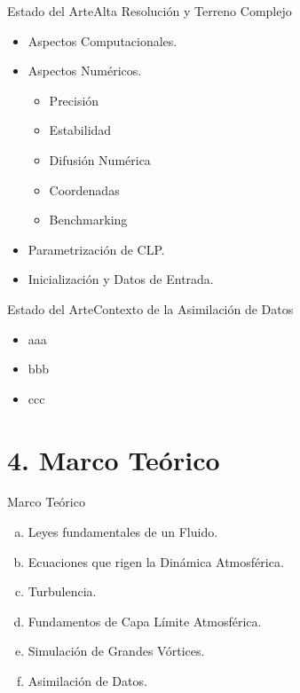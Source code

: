 \documentclass[mathserif]{beamer}
\begin{document}
\begin{frame}{Estado del Arte}{Alta Resolución y Terreno Complejo}
	\begin{itemize}
		\item Aspectos Computacionales.
		\item Aspectos Numéricos.
		\begin{itemize}
			\item Precisión
			\item Estabilidad
			\item Difusión Numérica
			\item Coordenadas
			\item Benchmarking
		\end{itemize}
		\item Parametrización de CLP.
		\item Inicialización y Datos de Entrada.
	\end{itemize}
\end{frame}

\begin{frame}{Estado del Arte}{Contexto de la Asimilación de Datos}
	\begin{itemize}
		\item aaa
		\item bbb
		\item ccc
	\end{itemize}
\end{frame}












\section{4. Marco Teórico}
\begin{frame}{Marco Teórico}
	\begin{enumerate}[a.]
		\item Leyes fundamentales de un Fluido.
		\item Ecuaciones que rigen la Dinámica Atmosférica.
		\item Turbulencia.
		\item Fundamentos de Capa Límite Atmosférica.
		\item Simulación de Grandes Vórtices.
		\item Asimilación de Datos.
	\end{enumerate}
\end{frame}
\end{document}
